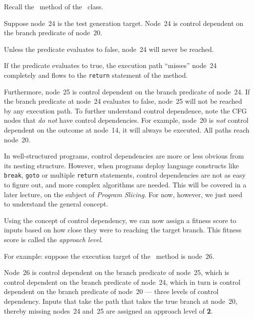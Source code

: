 Recall the \classifymethod~method of the \triangleclass~class. 


Suppose node~24 is the test generation target. Node~24 is control dependent on
the branch predicate of node~20. 


Unless the predicate evaluates to false, node~24 will never be reached. 


If the predicate evaluates to true, the execution path ``misses'' node~24
completely and flows to the {\tt return} statement of the method.



Furthermore, node~25 is control dependent on the branch predicate of node~24. If
the branch predicate at node~24 evaluates to false, node~25 will not be reached
by any execution path. To further understand control dependence, note the CFG
nodes that {\it do not} have control dependencies. For example, node~20 is {\it
not} control dependent on the outcome at node~14, it will always be executed.
All paths reach node~20. 

In well-structured programs, control dependencies are more or less obvious from
its nesting structure. However, when programs deploy language constructs like
{\tt break}, {\tt goto} or multiple {\tt return} statements, control
dependencies are not as easy to figure out, and more complex algorithms are
needed. This will be covered in a later lecture, on the subject of {\it Program
Slicing}. For now, however, we just need to understand the general concept. 

Using the concept of control dependency, we can now assign a fitness score to
inputs based on how close they were to reaching the target branch. This fitness
score is called the {\it approach level}. 


For example: suppose the execution target of the \classifymethod~method is
node~26. 


Node~26 is control dependent on the branch predicate of node~25, which is
control dependent on the branch predicate of node~24, which in turn is control
dependent on the branch predicate of node~20 --- three levels of control
dependency. Inputs that take the path that takes the true branch at node~20,
thereby missing nodes~24 and~25 are assigned an approach level of {\bf 2}. 

